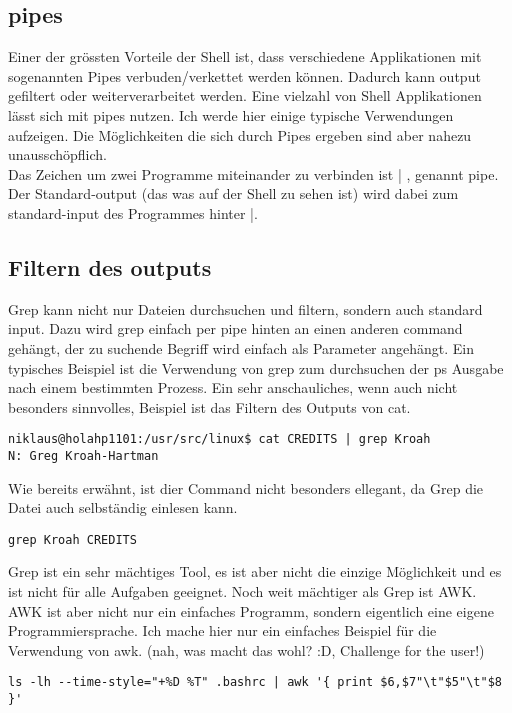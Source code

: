 \documentclass[10pt,paper=a4,final]{scrartcl}
\begin{document}
\subsection{pipes}
Einer der gr\"ossten Vorteile der Shell ist, dass verschiedene Applikationen mit sogenannten Pipes verbuden/verkettet werden k\"onnen. Dadurch kann output gefiltert oder weiterverarbeitet werden. Eine vielzahl von Shell Applikationen l\"asst sich mit pipes nutzen. Ich werde hier einige typische Verwendungen aufzeigen. Die M\"oglichkeiten die sich durch Pipes ergeben sind aber nahezu unaussch\"opflich.\\
Das Zeichen um zwei Programme miteinander zu verbinden ist | , genannt pipe. Der Standard-output (das was auf der Shell zu sehen ist) wird dabei zum standard-input des Programmes hinter |.
\subsection{Filtern des outputs}
Grep kann nicht nur Dateien durchsuchen und filtern, sondern auch standard input. Dazu wird grep einfach per pipe hinten an einen anderen command geh\"angt, der zu suchende Begriff wird einfach als Parameter angeh\"angt. Ein typisches Beispiel ist die Verwendung von grep zum durchsuchen der ps Ausgabe nach einem bestimmten Prozess. Ein sehr anschauliches, wenn auch nicht besonders sinnvolles, Beispiel ist das Filtern des Outputs von cat.
\begin{lstlisting}[frame=single, style=Shell]
niklaus@holahp1101:/usr/src/linux$ cat CREDITS | grep Kroah
N: Greg Kroah-Hartman
\end{lstlisting}
Wie bereits erw\"ahnt, ist dier Command nicht besonders ellegant, da Grep die Datei auch selbst\"andig einlesen kann.
\begin{lstlisting}[frame=single, style=Shell]
grep Kroah CREDITS
\end{lstlisting}
Grep ist ein sehr m\"achtiges Tool, es ist aber nicht die einzige M\"oglichkeit und es ist nicht f\"ur alle Aufgaben geeignet. Noch weit m\"achtiger als Grep ist AWK. AWK ist aber nicht nur ein einfaches Programm, sondern eigentlich eine eigene Programmiersprache. Ich mache hier nur ein einfaches Beispiel f\"ur die Verwendung von awk. (nah, was macht das wohl? :D, Challenge for the user!)
\begin{lstlisting}[frame=single, style=Shell]
ls -lh --time-style="+%D %T" .bashrc | awk '{ print $6,$7"\t"$5"\t"$8 }'
\end{lstlisting}
\end{document}
